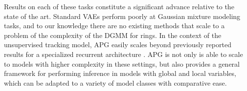 \documentclass{article}
\theoremstyle{definition}
\begin{document}
Results on each of these tasks constitute a significant advance relative to the state of the art. Standard VAEs perform poorly at Gaussian mixture modeling tasks, and to our knowledge there are no existing methods that scale to a problem of the complexity of the DGMM for rings. In the context of the unsupervised tracking model, APG easily scales beyond previously reported results for a specialized recurrent architecture \cite{kosiorek2018sequential}. APG is not only is able to scale to models with higher complexity in these settings, but also provides a general framework for performing inference in models with global and local variables, which can be adapted to a variety of model classes with comparative ease.
\end{document}
